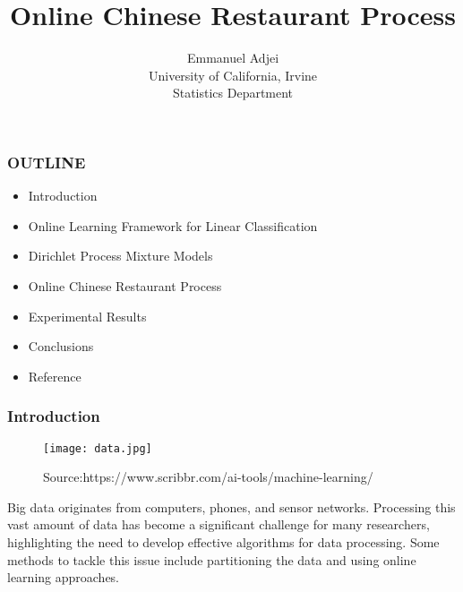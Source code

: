 \documentclass[11pt]{beamer}
\begin{document}
	\author{Emmanuel Adjei\\
		University of California, Irvine\\
		Statistics Department}
	\title{
	Online Chinese Restaurant Process }
	\begin{frame}[plain]
		\maketitle
	\end{frame}
	
	\begin{frame}
		\frametitle{OUTLINE}
		\begin{itemize}
			\item Introduction
			\item Online Learning Framework for Linear Classification
				\item Dirichlet Process Mixture Models 
				\item 	Online Chinese Restaurant Process 
				\item Experimental Results
				\item Conclusions 
			\item Reference
		\end{itemize}
	\end{frame}
	
	\begin{frame}
		\frametitle{Introduction}
		
		\begin{figure}
			\centering
			\texttt{[image: data.jpg]} 
			\caption{Source:https://www.scribbr.com/ai-tools/machine-learning/}
			\label{fig: Source: https://www.scribbr.com/ai-tools/machine-learning/} %
		\end{figure}
	
Big data originates from computers, phones, and sensor networks. Processing this vast amount of data has become a significant challenge for many researchers, highlighting the need to develop effective algorithms for data processing. Some methods to tackle this issue include partitioning the data and using online learning approaches.

		
	\end{frame}
	
\end{document}
